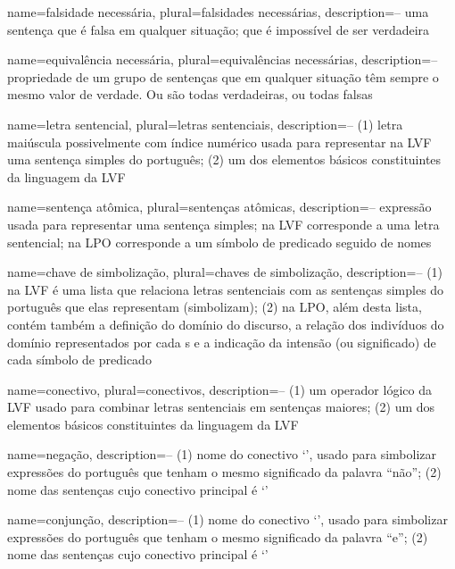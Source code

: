 {
 name={falsidade necessária},
 plural={falsidades necessárias},
 description={-- uma sentença que é falsa em qualquer situação; que é impossível de ser verdadeira}
}

{
 name={equivalência necessária},
 plural={equivalências necessárias},
 description={-- propriedade de um grupo de sentenças que em qualquer situação têm sempre o mesmo valor de verdade. Ou são todas verdadeiras, ou todas falsas}
}

{
 name=letra sentencial,
 plural=letras sentenciais,
 description={-- (1) letra maiúscula possivelmente com índice numérico usada para representar na LVF uma sentença simples do português; (2) um dos elementos básicos constituintes da linguagem da LVF}
}

{
 name=sentença atômica,
 plural=sentenças atômicas,
 description={-- expressão usada para representar uma sentença simples; na LVF corresponde a uma letra sentencial; na LPO corresponde a um símbolo de predicado seguido de nomes}
}

{
 name=chave de simbolização,
 plural=chaves de simbolização,
 description={-- (1) na LVF é uma lista que relaciona letras sentenciais com as sentenças simples do português que elas representam (simbolizam); (2) na LPO, além desta lista, contém também a definição do domínio do discurso, a relação dos indivíduos do domínio representados por cada s e a indicação da intensão (ou significado) de cada símbolo de predicado}
}

{
 name=conectivo,
 plural=conectivos,
description={-- (1) um operador lógico da LVF usado para combinar letras sentenciais em sentenças maiores; (2) um dos elementos básicos constituintes da linguagem da LVF}
}

{
 name=negação,
 description={-- (1) nome do conectivo `\enot', usado para simbolizar expressões do português que tenham o mesmo significado da palavra ``não''; (2) nome das sentenças cujo conectivo principal é `\enot'}
}

{
 name=conjunção,
 description={-- (1) nome do conectivo `\eand', usado para simbolizar expressões do português que tenham o mesmo significado da palavra ``e''; (2) nome das sentenças cujo conectivo principal é `\eand'}
}

